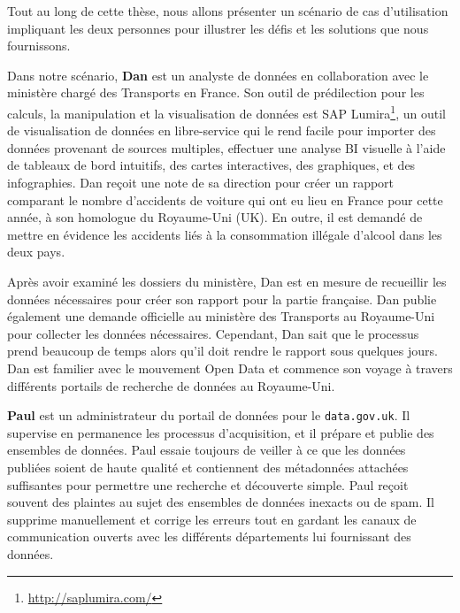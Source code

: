 Tout au long de cette th\`{e}se, nous allons pr\'{e}senter un sc\'{e}nario de cas d'utilisation impliquant les deux personnes pour illustrer les d\'{e}fis et les solutions que nous fournissons.

Dans notre sc\'{e}nario, \textbf{Dan} est un analyste de donn\'{e}es en collaboration avec le minist\`{e}re charg\'{e} des Transports en France. Son outil de pr\'{e}dilection pour les calculs, la manipulation et la visualisation de donn\'{e}es est SAP Lumira\footnote{\url{http://saplumira.com/}}, un outil de visualisation de donn\'{e}es en libre-service qui le rend facile pour importer des donn\'{e}es provenant de sources multiples, effectuer une analyse BI visuelle \`{a} l'aide de tableaux de bord intuitifs, des cartes interactives, des graphiques, et des infographies. Dan re\c{c}oit une note de sa direction pour cr\'{e}er un rapport comparant le nombre d'accidents de voiture qui ont eu lieu en France pour cette ann\'{e}e, \`{a} son homologue du Royaume-Uni (UK). En outre, il est demand\'{e} de mettre en \'{e}vidence les accidents li\'{e}s \`{a} la consommation ill\'{e}gale d'alcool dans les deux pays.

Apr\`{e}s avoir examin\'{e} les dossiers du minist\`{e}re, Dan est en mesure de recueillir les donn\'{e}es n\'{e}cessaires pour cr\'{e}er son rapport pour la partie française. Dan publie \'{e}galement une demande officielle au minist\`{e}re des Transports au Royaume-Uni pour collecter les donn\'{e}es n\'{e}cessaires. Cependant, Dan sait que le processus prend beaucoup de temps alors qu'il doit rendre le rapport sous quelques jours. Dan est familier avec le mouvement Open Data et commence son voyage \`{a} travers diff\'{e}rents portails de recherche de donn\'{e}es au Royaume-Uni.

\textbf{Paul} est un administrateur du portail de donn\'{e}es pour le \texttt{data.gov.uk}. Il supervise en permanence les processus d'acquisition, et il pr\'{e}pare et publie des ensembles de donn\'{e}es. Paul essaie toujours de veiller \`{a} ce que les donn\'{e}es publi\'{e}es soient de haute qualit\'{e} et contiennent des m\'{e}tadonn\'{e}es attach\'{e}es suffisantes pour permettre une recherche et d\'{e}couverte simple. Paul re\c{c}oit souvent des plaintes au sujet des ensembles de donn\'{e}es inexacts ou de spam. Il supprime manuellement et corrige les erreurs tout en gardant les canaux de communication ouverts avec les diff\'{e}rents d\'{e}partements lui fournissant des donn\'{e}es.



